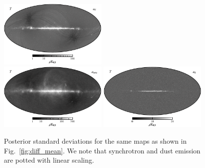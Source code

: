 \documentclass{aa}
\begin{document}
\begin{figure}[p]
  \includegraphics[width=0.47\textwidth]{figs/ff_stddev_30arcmin_T_w12_cb_c-neutral.pdf}\\
  \includegraphics[width=0.47\textwidth]{figs/ame_stddev_120arcmin_T_w12_cb_c-neutral.pdf}
  \includegraphics[width=0.47\textwidth]{figs/dust_stddev_10arcmin_T_w12_cb_c-neutral.pdf}
  \caption{Posterior standard deviations for the same maps as shown in
    Fig.~\ref{fig:diff_mean}. We note that synchrotron and dust emission are potted
    with linear scaling.
  }
  \label{fig:diff_rms}
\end{figure}
\end{document}
